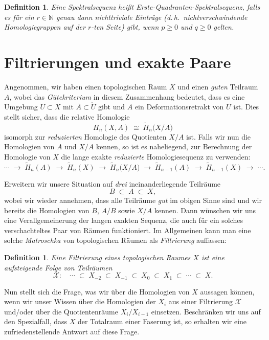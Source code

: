 \documentclass[12pt, hidelinks]{article}
\numberwithin{conj}{section}
\newtheorem{definition}[conj]{Definition}
\begin{document}
\begin{definition}
    Eine Spektralsequenz heißt \emph{Erste-Quadranten-Spektralsequenz}, falls es für ein $r \in \mathbb{N}$ genau dann nichttriviale Einträge (d.\,h.\ nichtverschwindende Homologiegruppen auf der $r$-ten Seite) gibt, wenn $p \ge 0$ und $q \ge 0$ gelten.
\end{definition}

\section{Filtrierungen und exakte Paare}
Angenommen, wir haben einen topologischen Raum $X$ und einen \emph{guten} Teilraum $A$, wobei das \emph{Gütekriterium} in diesem Zusammenhang bedeutet, dass es eine Umgebung $U \subset X$ mit $\overline{A} \subset \mathring{U}$ gibt und $A$ ein Deformationsretrakt von $U$ ist. Dies stellt sicher, dass die relative Homologie
\[
    H_n(X,A) \;\cong\; \tilde{H}_n\bigl(X/A\bigr)
\]
isomorph zur \emph{reduzierten} Homologie des Quotienten $X/A$ ist. Falls wir nun die Homologien von $A$ und $X/A$ kennen, so ist es naheliegend, zur Berechnung der Homologie von $X$ die lange exakte \emph{reduzierte} Homologiesequenz zu verwenden:
\[
    \cdots \;\longrightarrow\; \tilde{H}_n(A)
    \;\longrightarrow\; \tilde{H}_n(X)
    \;\longrightarrow\; \tilde{H}_n\bigl(X/A\bigr)
    \;\longrightarrow\;
    \tilde{H}_{n-1}(A)
    \;\longrightarrow\;
    \tilde{H}_{n-1}(X)
    \;\longrightarrow\; \cdots.
\]

Erweitern wir unsere Situation auf \emph{drei} ineinanderliegende Teilräume
\[
    B \;\subset\; A \;\subset\; X,
\]
wobei wir wieder annehmen, dass alle Teilräume \emph{gut} im obigen Sinne sind und wir bereits die Homologien von $B$, $A/B$ sowie $X/A$ kennen. Dann wünschen wir uns eine Verallgemeinerung der langen exakten Sequenz, die auch für ein solches verschachteltes Paar von Räumen funktioniert. Im Allgemeinen kann man eine solche \emph{Matroschka} von topologischen Räumen als \emph{Filtrierung} auffassen:

\begin{definition}
    Eine \emph{Filtrierung} eines topologischen Raumes $X$ ist eine aufsteigende Folge von Teilräumen
    \[
        \mathcal{X}:\quad
        \cdots \;\subset\; X_{-2} \;\subset\; X_{-1}
        \;\subset\; X_{0} \;\subset\; X_{1} \;\subset\; \cdots \;\subset\; X.
    \]
\end{definition}

Nun stellt sich die Frage, was wir über die Homologien von $X$ aussagen können, wenn wir unser Wissen über die Homologien der $X_i$ aus einer Filtrierung $\mathcal{X}$ und/oder über die Quotientenräume $X_i/X_{i-1}$ einsetzen. Beschränken wir uns auf den Spezialfall, dass $X$ der Totalraum einer Faserung ist, so erhalten wir eine zufriedenstellende Antwort auf diese Frage.
\end{document}
